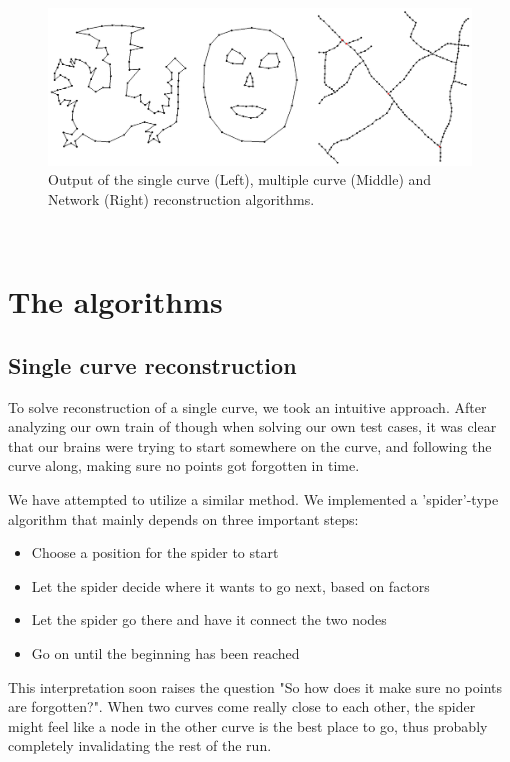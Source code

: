 \documentclass[11pt]{article}
\begin{document}
\begin{figure}[ht!]
\centering
\includegraphics[scale=0.3]{images/outputOverview.png}
\caption{Output of the single curve (Left), multiple curve (Middle) and Network (Right) reconstruction algorithms.}
\label{outputOverview}
\end{figure}$ $\\


\section{The algorithms}
\label{se:algorithms}

\subsection{Single curve reconstruction}
To solve reconstruction of a single curve, we took an intuitive approach. After analyzing our own train of though when solving our own test cases, it was clear that our brains were trying to start somewhere on the curve, and following the curve along, making sure no points got forgotten in time.

We have attempted to utilize a similar method. We implemented a 'spider'-type algorithm that mainly depends on three important steps:
\begin{itemize}
\item Choose a position for the spider to start
\item Let the spider decide where it wants to go next, based on factors
\item Let the spider go there and have it connect the two nodes
\item Go on until the beginning has been reached
\end{itemize}

This interpretation soon raises the question "So how does it make sure no points are forgotten?".
When two curves come really close to each other, the spider might feel like a node in the other curve is the best place to go, thus probably completely invalidating the rest of the run.
\end{document}
